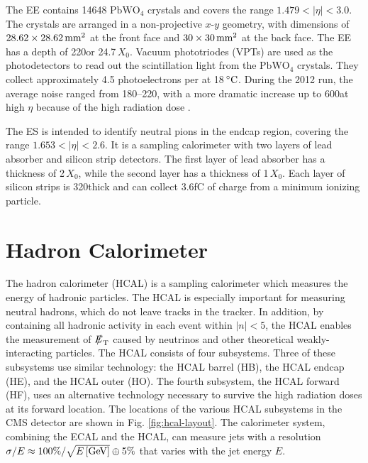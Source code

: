 \documentclass[12pt]{thesis}  %
\newcommand{\pbwo}{\ensuremath{\text{PbWO}_{4}}\xspace}
\newcommand{\degC}{\ensuremath{\,\de\text{C}}\xspace}
\def\eslash{\ensuremath{{\hbox{$E$\kern-0.6em\lower-.05ex\hbox{/}\kern0.10em}}}}
\def\met{\mbox{$\eslash_\text{T}$}\xspace} %
\begin{document}
The EE contains 14648 \pbwo crystals and covers the range $1.479<|\eta|<3.0$. The crystals are arranged in a non-projective $x$-$y$ geometry, with dimensions of $28.62\times28.62\,\text{mm}^{2}$ at the front face and $30\times30\,\text{mm}^{2}$ at the back face. The EE has a depth of 220\mm or 24.7$\,X_{0}$. Vacuum phototriodes (VPTs) are used as the photodetectors to read out the scintillation light from the \pbwo crystals. They collect approximately 4.5 photoelectrons per \MeVns at 18\degC. During the 2012 run, the average noise ranged from 180--220\MeV, with a more dramatic increase up to 600\MeV at high $\eta$ because of the high radiation dose \cite{CMS:2013ecal}.

The ES is intended to identify neutral pions in the endcap region, covering the range $1.653<|\eta|<2.6$. It is a sampling calorimeter with two layers of lead absorber and silicon strip detectors. The first layer of lead absorber has a thickness of 2$\,X_{0}$, while the second layer has a thickness of 1$\,X_{0}$. Each layer of silicon strips is 320\mum thick and can collect 3.6\unit{fC} of charge from a minimum ionizing particle.


\section{Hadron Calorimeter}

The hadron calorimeter (HCAL) is a sampling calorimeter which measures the energy of hadronic particles. The HCAL is especially important for measuring neutral hadrons, which do not leave tracks in the tracker. In addition, by containing all hadronic activity in each event within $|n|<5$, the HCAL enables the measurement of \met caused by neutrinos and other theoretical weakly-interacting particles. The HCAL consists of four subsystems. Three of these subsystems use similar technology: the HCAL barrel (HB), the HCAL endcap (HE), and the HCAL outer (HO). The fourth subsystem, the HCAL forward (HF), uses an alternative technology necessary to survive the high radiation doses at its forward location. The locations of the various HCAL subsystems in the CMS detector are shown in Fig. \ref{fig:hcal-layout}. The calorimeter system, combining the ECAL and the HCAL, can measure jets with a resolution $\sigma/E \approx 100\% / \sqrt{E\,[\text{Ge\hspace{-.08em}V}]} \oplus 5\%$ that varies with the jet energy $E$.
\end{document}
